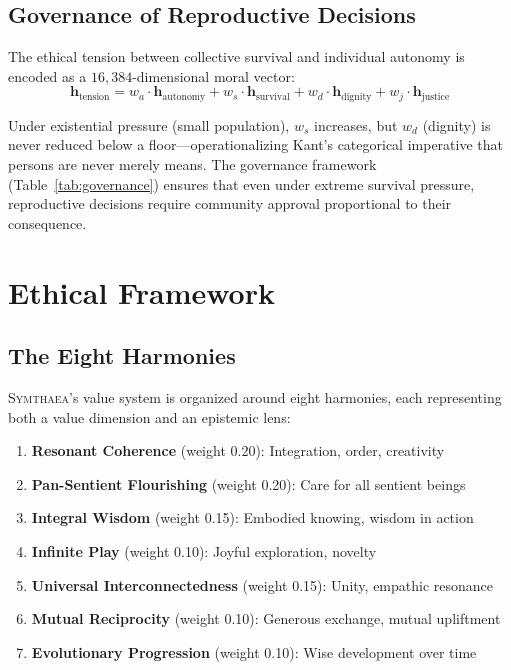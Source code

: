 \documentclass[11pt,letterpaper]{article}
\newcommand{\hv}{\mathbf{h}}
\newcommand{\dimHDC}{16{,}384}
\newcommand{\symthaea}{\textsc{Symthaea}}
\begin{document}
\subsection{Governance of Reproductive Decisions}

The ethical tension between collective survival and individual autonomy is
encoded as a $\dimHDC$-dimensional moral vector:
\begin{equation}
\hv_\text{tension} = w_a \cdot \hv_\text{autonomy} + w_s \cdot \hv_\text{survival} + w_d \cdot \hv_\text{dignity} + w_j \cdot \hv_\text{justice}
\label{eq:tension}
\end{equation}

Under existential pressure (small population), $w_s$ increases, but
$w_d$ (dignity) is never reduced below a floor---operationalizing Kant's
categorical imperative that persons are never merely means. The governance
framework (Table~\ref{tab:governance}) ensures that even under extreme survival
pressure, reproductive decisions require community approval proportional to their
consequence.


\section{Ethical Framework}
\label{sec:ethics}

\subsection{The Eight Harmonies}

\symthaea{}'s value system is organized around eight harmonies, each representing
both a value dimension and an epistemic lens:

\begin{enumerate}[nosep,leftmargin=2em]
\item \textbf{Resonant Coherence} (weight 0.20): Integration, order, creativity
\item \textbf{Pan-Sentient Flourishing} (weight 0.20): Care for all sentient beings
\item \textbf{Integral Wisdom} (weight 0.15): Embodied knowing, wisdom in action
\item \textbf{Infinite Play} (weight 0.10): Joyful exploration, novelty
\item \textbf{Universal Interconnectedness} (weight 0.15): Unity, empathic resonance
\item \textbf{Mutual Reciprocity} (weight 0.10): Generous exchange, mutual upliftment
\item \textbf{Evolutionary Progression} (weight 0.10): Wise development over time
\end{enumerate}
\end{document}
